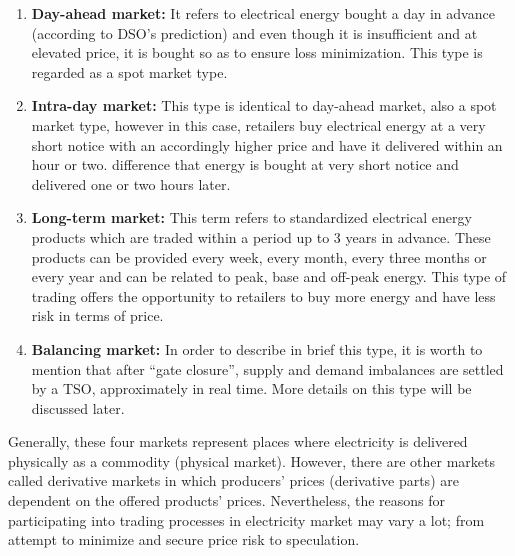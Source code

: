 \begin{enumerate}
\item \textbf{Day-ahead market:} It refers to electrical energy bought a day in advance (according to DSO’s prediction) and even though it is insufficient and at elevated price, it is bought so as to ensure loss minimization. This type is regarded as a spot market type. 
\item	\textbf{Intra-day market:} This type is identical to day-ahead market, also a spot market type, however in this case, retailers buy electrical energy at a very short notice with an accordingly higher price and have it delivered within an hour or two.  difference that energy is bought at very short notice and delivered one or two hours later. 
\item \textbf{Long-term market:} This term refers to standardized electrical energy products which are traded within a period up to 3 years in advance. These products can be provided every week, every month, every three months or every year and can be related to peak, base and off-peak energy. This type of trading offers the opportunity to retailers to buy more energy and have less risk in terms of price. 
\item	\textbf{Balancing market:} In order to describe in brief this type, it is worth to mention that after “gate closure”, supply and demand imbalances are settled by a TSO, approximately in real time. More details on this type will be discussed later. 
\end{enumerate}
Generally, these four markets represent places where electricity is delivered physically as a commodity (physical market). However, there are other markets called derivative markets in which producers’ prices (derivative parts) are dependent on the offered products’ prices. Nevertheless, the reasons for participating into trading processes in electricity market may vary a lot; from attempt to minimize and secure price risk to speculation. 

